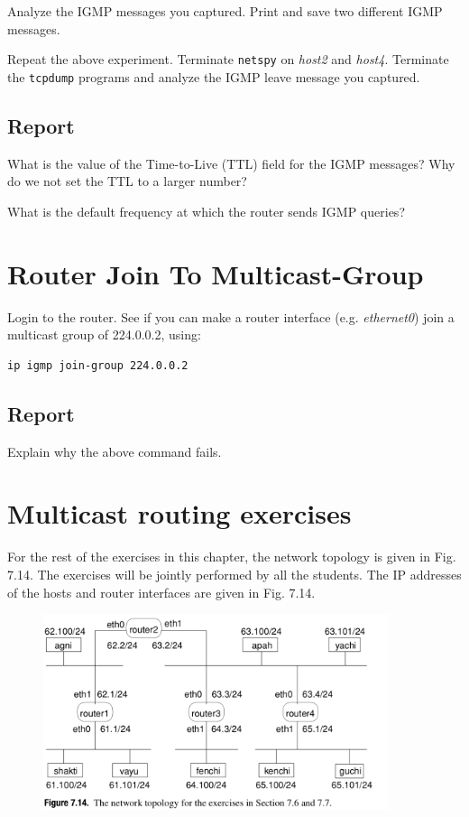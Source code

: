 \documentclass{../UTNetLab}
\begin{document}
    Analyze the IGMP messages you captured.
    Print and save two different IGMP messages.

    Repeat the above experiment.
    Terminate \lstinline{netspy} on \textit{host2} and \textit{host4}.
    Terminate the \lstinline{tcpdump} programs and analyze the IGMP leave message you captured.
    
    \subsection*{Report}
    What is the value of the Time-to-Live (TTL) field for the IGMP messages?
    Why do we not set the TTL to a larger number?

    What is the default frequency at which the router sends IGMP queries?

\section{Router Join To Multicast-Group}
    Login to the router.
    See if you can make a router interface (e.g. \textit{ethernet0}) join a multicast group of 224.0.0.2, using:
    \begin{lstlisting}[language={cisco}]
ip igmp join-group 224.0.0.2
    \end{lstlisting}
    
    \subsection*{Report}
    Explain why the above command fails.

\section*{Multicast routing exercises}
    For the rest of the exercises in this chapter, the network topology is given in Fig. 7.14. The exercises will be jointly performed by all the students. The IP addresses of the hosts and router interfaces are given in Fig. 7.14.
    \begin{figure}[H]
        \centering
        \includegraphics[width=0.9\textwidth]{img/figure7-14.png}
        \label{fig:7.14}
    \end{figure}
\end{document}
